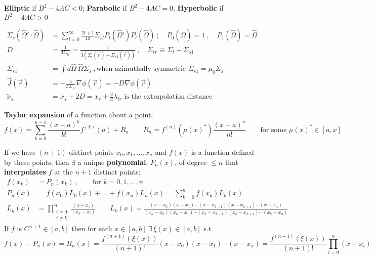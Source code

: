 \documentclass[12pt]{article}
\newcommand{\vOmega}{\ensuremath{\hat{\Omega}}}
\newcommand{\Macro}{\ensuremath{\Sigma}}
\begin{document}
\textbf{Elliptic} if $B^2 - 4 AC < 0$; \textbf{Parabolic} if $B^2 - 4 AC = 0$; \textbf{Hyperbolic} if $B^2 - 4 AC > 0$

\begin{align*}
\Sigma_s(\vOmega' \cdot \vOmega) &= \sum_{l=0}^{\infty} \frac{2l+1}{4\pi} \Sigma_{sl} P_l(\vOmega')P_l(\vOmega)\:; \quad P_0 (\vOmega) = 1\:, \quad P_1 (\vOmega) = \vOmega \\
%
D &= \frac{1}{3\Sigma_{tr}} = \frac{1}{3(\Sigma_t(\vec{r}) - \Sigma_{s1}(\vec{r}))}\:, \quad \Sigma_{tr} \equiv \Sigma_t - \Sigma_{s1}\\
\Macro_{s1}  &= \int d\vOmega \:\vOmega \Macro_{s}\:, \text{when azimuthally symmetric }\Macro_{s1} = \bar{\mu}_{0}\Macro_{s}\\
%
\vec{J}(\vec{r}) &= -\frac{1}{3\Sigma_{tr}} \nabla \phi(\vec{r}) = -D\nabla \phi(\vec{r})\\
%
\tilde{x}_s &= x_s + 2D = x_s + \frac{2}{3}\lambda_{tr}\text{ is the extrapolation distance}
\end{align*}


\textbf{Taylor expansion} of a function about a point:
\begin{equation}
f(x) = \sum_{k=0}^{n-1}\frac{(x-a)^k}{k!}f^{(k)}(a) + R_n \qquad R_n = f^{(n)}(\mu(x)^*)\frac{(x-a)^{n}}{n!} \qquad \text{for some } \mu(x)^* \in [a, x]\nonumber
\end{equation}

If we have $(n+1)$ distinct points $x_0, x_1,\dots, x_n$ and $f(x)$ is a function defined by these points, then $\exists$ a unique \textbf{polynomial}, $P_n(x)$, of degree $\leq n$ that \textbf{interpolates} $f$ at the $n + 1$ distinct points:
\begin{align*}
f(x_k) &= P_{n}(x_k)\:, \qquad \text{for }k= 0, 1, \dots, n\\
%
P_{n}(x) &= f(x_0)L_0(x) + \dots + f(x_n)L_n(x) = \sum_{k=0}^{n}f(x_k)L_k(x)\\
%
L_k(x) &= \prod_{\substack{i=0\\ i \neq k}}^n \frac{(x-x_i)}{(x_k-x_i)} \qquad
%
L_k(x) = \frac{(x-x_0)(x-x_1)\cdots(x-x_{k-1})(x-x_{k+1})\cdots(x-x_n)}{(x_k-x_0)(x_k-x_1)\cdots(x_k-x_{k-1})(x_k-x_{k+1})\cdots(x_k-x_n)}\nonumber
\end{align*}
 If $f$ is $C^{n+1} \in [a,b]$ then for each $x\in [a,b] \: \exists \: \xi(x) \in [a,b]$ s.t.
\[
f(x) - P_n(x) = R_{n}(x) = \frac{f^{(n+1)}(\xi(x))}{(n+1)!}(x-x_0)(x-x_1)\cdots(x-x_n) = \frac{f^{(n+1)}(\xi(x))}{(n+1)!}\prod_{i=0}^n (x-x_i)\]
\end{document}
